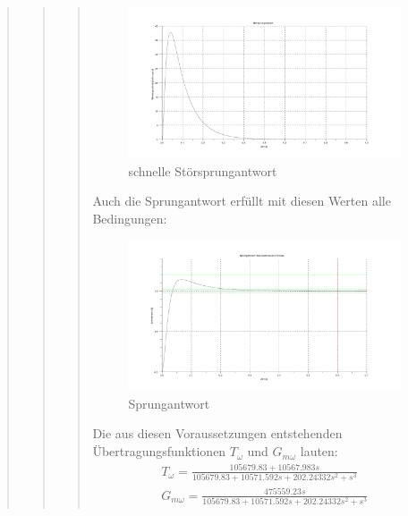 \begin{quote}
\begin{quote}
\begin{quote}
			\begin{figure}[H]
            \centering
                \includegraphics[scale=0.5, trim = 0cm 0cm 0cm 0cm, clip]{./Bilder/Stoersprungantwortschnell}
                    \caption{schnelle Störsprungantwort}
                    \label{fig:Stoersprungantwortschnell}
            \end{figure}
            
            Auch die Sprungantwort erfüllt mit diesen Werten alle Bedingungen:
            \begin{figure}[H]
            \centering
                \includegraphics[scale=0.5, trim = 0cm 0cm 0cm 0cm, clip]{./Bilder/Sprungantwortschnell}
                    \caption{Sprungantwort}
                    \label{fig:./Bilder/Sprungantwortschnell}
            \end{figure}
    
    
            Die aus diesen Voraussetzungen entstehenden Übertragungsfunktionen $T_\omega$ und $G_{m\omega}$ lauten:
            \begin{equation*}
            	\begin{split}
            		T_\omega = \frac{105679.83 + 10567.983s}{105679.83 + 10571.592s + 202.24332s^2 + s^3}\\
            		G_{m\omega} = \frac{475559.23s}{105679.83 + 10571.592s + 202.24332s^2 + s^3}
            	\end{split}
            \end{equation*}
		\end{quote}
		

\end{quote}
\end{quote}

